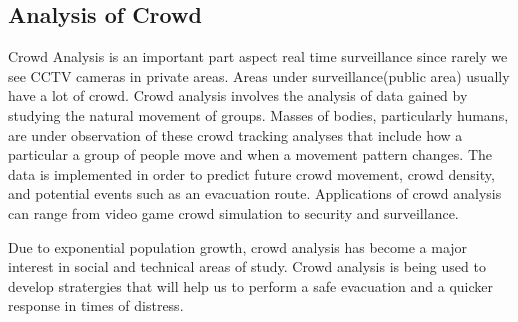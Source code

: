 \subsection{Analysis of Crowd}
Crowd Analysis\cite{crowd} is an important part aspect real time surveillance since rarely we see CCTV cameras in private areas. Areas under surveillance(public area) usually have a lot of crowd.
Crowd analysis involves the analysis of data gained by studying the natural
movement of groups. Masses of bodies, particularly humans, are under observation
of these crowd tracking analyses that include how a particular a group of people move and when a
movement pattern changes. The data is implemented in order to predict future crowd
movement, crowd density, and potential events such as an evacuation route.
Applications of crowd analysis can range from video game crowd simulation to security
and surveillance.
\par
Due to exponential population growth, crowd analysis has become a major interest in social
and technical areas of study. Crowd analysis is being used to develop stratergies that will help us to perform a safe evacuation and a quicker response in times of distress. 
